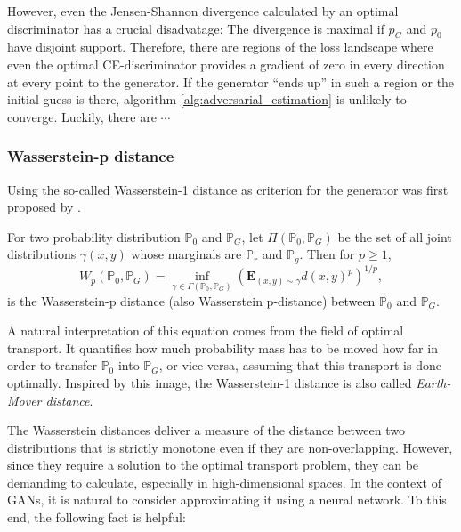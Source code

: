 However, even the Jensen-Shannon divergence calculated by an optimal discriminator has a crucial disadvatage:
The divergence is maximal if $p_G$ and $p_0$ have disjoint support. %
Therefore, there are regions of the loss landscape where even the optimal CE-discriminator provides a gradient of zero in every direction at every point to the generator.
If the generator ``ends up'' in such a region or the initial guess is there, algorithm \ref{alg:adversarial_estimation} is unlikely to converge.
Luckily, there are $\cdots$

\subsubsection{Wasserstein-p distance}
\label{sec:wasserstein_loss}

Using the so-called Wasserstein-1 distance as criterion for the generator was first proposed by \Textcite{arjovsky2017wassersteingan}.%

\begin{definition}
    For two probability distribution $\mathbb{P}_0$ and $\mathbb{P}_G$, let $\Pi (\mathbb{P}_0, \mathbb{P}_G)$ be the set of all joint distributions $\gamma(x, y)$ whose marginals are $\mathbb{P}_r$ and $\mathbb{P}_g$.
    Then for $p \geq 1$,%
    $$
    W_p(\mathbb{P}_0, \mathbb{P}_G) = \inf_{\gamma \in \Gamma(\mathbb{P}_0, \mathbb{P}_G)} \left(\mathbf{E}_{(x, y) \sim \gamma} d(x, y)^p \right)^{1/p},
    $$
    is the Wasserstein-p distance (also Wasserstein p-distance) between $\mathbb{P}_0$ and $\mathbb{P}_G$.
\end{definition}

A natural interpretation of this equation comes from the field of optimal transport.
It quantifies how much probability mass has to be moved how far in order to transfer $\mathbb{P}_0$ into $\mathbb{P}_G$, or vice versa, assuming that this transport is done optimally.
Inspired by this image, the Wasserstein-1 distance is also called \textit{Earth-Mover distance}.

The Wasserstein distances deliver a measure of the distance between two distributions that is strictly monotone even if they are non-overlapping. %
However, since they require a solution to the optimal transport problem, they can be demanding to calculate, especially in high-dimensional spaces. %
In the context of GANs, it is natural to consider approximating it using a neural network.
To this end, the following fact is helpful:


